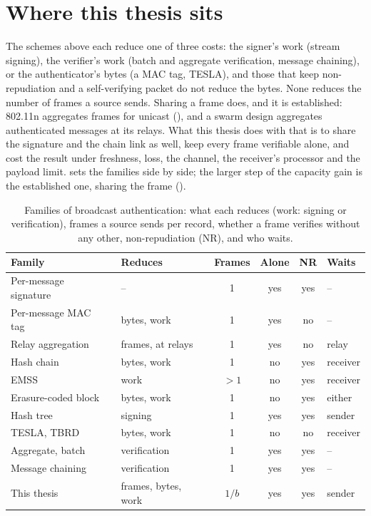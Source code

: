 \section{Where this thesis sits}

The schemes above each reduce one of three costs: the signer's work (stream signing), the
verifier's work (batch and aggregate verification, message chaining), or the authenticator's
bytes (a MAC tag, TESLA), and those that keep non-repudiation and a self-verifying packet do not
reduce the bytes. None reduces the number of frames a source sends. Sharing a frame does, and it
is established: 802.11n aggregates frames for unicast (), and a swarm
design aggregates authenticated messages at its relays. What this thesis does with that is to
share the signature and the chain link as well, keep every frame verifiable alone, and cost the
result under freshness, loss, the channel, the receiver's processor and the payload limit.
 sets the families side by side; the larger step of the capacity gain is the
established one, sharing the frame ().

\begin{table}[htbp]\centering\small
\caption{Families of broadcast authentication: what each reduces (work: signing or verification),
frames a source sends per record, whether a frame verifies without any other, non-repudiation
(NR), and who waits.}
\label{tab:position}
\setlength{\tabcolsep}{3pt}
\begin{tabular}{@{}l l c c c l@{}}
\toprule
\textbf{Family} & \textbf{Reduces} & \textbf{Frames} & \textbf{Alone} & \textbf{NR} & \textbf{Waits} \\
\midrule
Per-message signature~\cite{etsi_ts103097} & -- & 1 & yes & yes & -- \\
Per-message MAC tag~\cite{mavlink2signing,rotta2024telemetrybroadcast} & bytes, work & 1 & yes & no & -- \\
Relay aggregation~\cite{rotta2024telemetrybroadcast} & frames, at relays & 1 & yes & no & relay \\
Hash chain~\cite{gennaro1997streams} & bytes, work & 1 & no & yes & receiver \\
EMSS~\cite{perrig2000emss} & work & $>1$ & no & yes & receiver \\
Erasure-coded block~\cite{pannetrat2003multicast} & bytes, work & 1 & no & yes & either \\
Hash tree~\cite{wong1999flows} & signing & 1 & yes & yes & sender \\
TESLA, TBRD~\cite{perrig2002tesla,veara2025tbrd} & bytes, work & 1 & no & no & receiver \\
Aggregate, batch~\cite{bgls2003,zhang2008batch,li2025clas} & verification & 1 & yes & yes & -- \\
Message chaining~\cite{cominetti2022chaining} & verification & 1 & yes & yes & -- \\
This thesis & frames, bytes, work & $1/b$ & yes & yes & sender \\
\bottomrule
\end{tabular}
\end{table}

